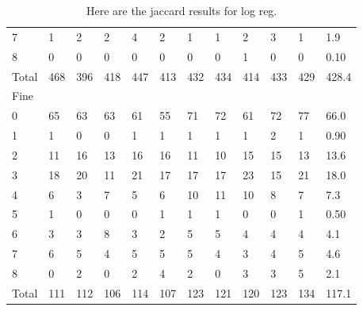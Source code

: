 \documentclass[ms]{nuthesis}
\begin{document}
\begin{table}[h]
\begin{tabular}{|l||l||l||l||l||l||l||l||l||l||l||l|}
    7 & 1 & 2 & 2 & 4 & 2 & 1 & 1 & 2 & 3 & 1 & 1.9 \\
    8 & 0 & 0 & 0 & 0 & 0 & 0 & 0 & 1 & 0 & 0 & 0.10 \\
    Total & 468 & 396 & 418 & 447 & 413 & 432 & 434 & 414 & 433 & 429 & 428.4 \\
    Fine &  &  &  &  &  &  &  &  &  &  &  \\
    0 & 65 & 63 & 63 & 61 & 55 & 71 & 72 & 61 & 72 & 77 & 66.0 \\
    1 & 1 & 0 & 0 & 1 & 1 & 1 & 1 & 1 & 2 & 1 & 0.90 \\
    2 & 11 & 16 & 13 & 16 & 16 & 11 & 10 & 15 & 15 & 13 & 13.6 \\
    3 & 18 & 20 & 11 & 21 & 17 & 17 & 17 & 23 & 15 & 21 & 18.0 \\
    4 & 6 & 3 & 7 & 5 & 6 & 10 & 11 & 10 & 8 & 7 & 7.3 \\
    5 & 1 & 0 & 0 & 0 & 1 & 1 & 1 & 0 & 0 & 1 & 0.50 \\
    6 & 3 & 3 & 8 & 3 & 2 & 5 & 5 & 4 & 4 & 4 & 4.1 \\
    7 & 6 & 5 & 4 & 5 & 5 & 5 & 4 & 3 & 4 & 5 & 4.6 \\
    8 & 0 & 2 & 0 & 2 & 4 & 2 & 0 & 3 & 3 & 5 & 2.1 \\
    Total & 111 & 112 & 106 & 114 & 107 & 123 & 121 & 120 & 123 & 134 & 117.1 \\ \bottomrule
  \end{tabular}
  \caption{Here are the jaccard results for log reg.}
  \label{tab:SVM}
\end{table}
\FloatBarrier
\end{document}
